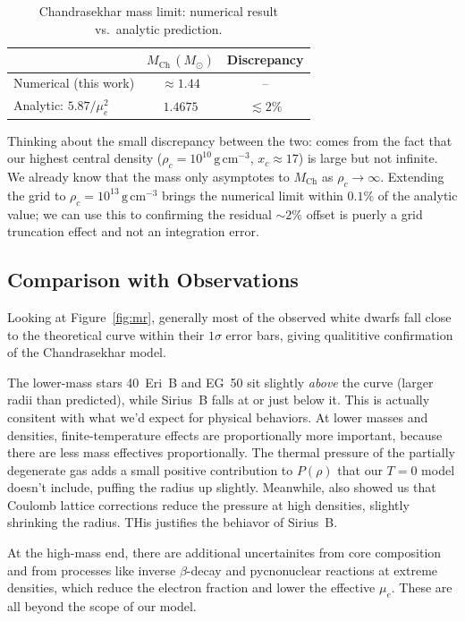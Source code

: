 \documentclass[12pt,letterpaper]{article}
\begin{document}
\begin{table}[htbp]
  \centering
  \caption{Chandrasekhar mass limit: numerical result vs.\ analytic prediction.}
  \label{tab:chandrasekhar}
  \begin{tabular}{lcc}
    \toprule
    & $M_\mathrm{Ch}\,(M_\odot)$ & Discrepancy \\
    \midrule
    Numerical (this work)           & $\approx 1.44$ & -- \\
    Analytic: $5.87/\mu_e^2$        & $1.4675$       & $\lesssim 2\%$ \\
    \bottomrule
  \end{tabular}
\end{table}

Thinking about the small discrepancy between the two: comes from the fact that our highest
central density ($\rho_c = 10^{10}\,\mathrm{g\,cm^{-3}}$, $x_c \approx 17$) is large
but not infinite. We already know that the mass only asymptotes to $M_\mathrm{Ch}$ as $\rho_c \to \infty$.
Extending the grid to $\rho_c = 10^{13}\,\mathrm{g\,cm^{-3}}$ brings the numerical limit
within $0.1\%$ of the analytic value; we can use this to confirming the residual $\sim 2\%$ offset is
puerly a grid truncation effect and not an integration error.

\subsection{Comparison with Observations}

Looking at Figure~\ref{fig:mr}, generally most of the observed white dwarfs fall close to
the theoretical curve within their $1\sigma$ error bars, giving qualititive confirmation
of the Chandrasekhar model.

The lower-mass stars 40~Eri~B and EG~50 sit slightly \textit{above} the curve
(larger radii than predicted), while Sirius~B falls at or just below it.
This is actually consitent with what we'd expect for physical behaviors. At lower masses and densities, finite-temperature
effects are proportionally more important, because there are less mass effectives proportionally. The thermal pressure of the partially
degenerate gas adds a small positive contribution to $P(\rho)$ that our $T=0$ model
doesn't include, puffing the radius up slightly.
Meanwhile, \citet{hamada1961} also showed us that Coulomb lattice corrections reduce the
pressure at high densities, slightly shrinking the radius. THis justifies the behiavor of Sirius~B.

At the high-mass end, there are additional uncertainites from core composition and
from processes like inverse $\beta$-decay and pycnonuclear reactions at extreme densities,
which reduce the electron fraction and lower the effective $\mu_e$.
These are all beyond the scope of our model.
\end{document}
